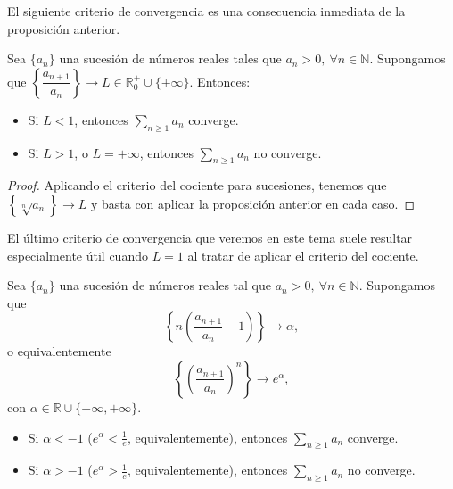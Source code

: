 El siguiente criterio de convergencia es una consecuencia inmediata de la proposición anterior.
\begin{coro}
    Sea $\{a_n\}$ una sucesión de números reales tales que $a_n > 0, ~ \forall n \in \mathbb{N}$. Supongamos que $\left\{ \dfrac{a_{n+1}}{a_n}\right\} \longrightarrow L \in \mathbb{R}^+_0 \cup \{+ \infty\}$. Entonces:
    \begin{itemize}
        \item Si $L < 1$, entonces $\displaystyle\sum_{n \geq 1} a_n$ converge.

        \item Si $L > 1$, o $L = + \infty$, entonces $\displaystyle\sum_{n \geq 1} a_n$ no converge.
    \end{itemize}
\end{coro}
\begin{proof}
    Aplicando el criterio del cociente para sucesiones, tenemos que $\left\{\sqrt[n]{a_n}\right\} \longrightarrow L$ y basta con aplicar la proposición anterior en cada caso.
\end{proof}

El último criterio de convergencia que veremos en este tema suele resultar especialmente útil cuando $L = 1$ al tratar de aplicar el criterio del cociente.

\begin{prop}
    Sea $\{a_n\}$ una sucesión de números reales tal que $a_n > 0, ~ \forall n \in \mathbb{N}$.
    Supongamos que
    \begin{equation*}
        \left\{ n\left(\frac{a_{n+1}}{a_n}-1\right) \right\} \longrightarrow \alpha,
    \end{equation*}
    o equivalentemente
    \begin{equation*}
        \left\{ \left(\frac{a_{n+1}}{a_n}\right)^n \right\} \longrightarrow e^\alpha,
    \end{equation*}
    con $\alpha \in \mathbb{R} \cup \{-\infty,+\infty\}$.

    \begin{itemize}
        \item Si $\alpha < -1$ ($e^\alpha < \frac{1}{e}$, equivalentemente), entonces $\displaystyle\sum_{n \geq 1} a_n$ converge.

        \item Si $\alpha > -1$ ($e^\alpha > \frac{1}{e}$, equivalentemente), entonces $\displaystyle\sum_{n \geq 1} a_n$ no converge.
    \end{itemize}
\end{prop}

